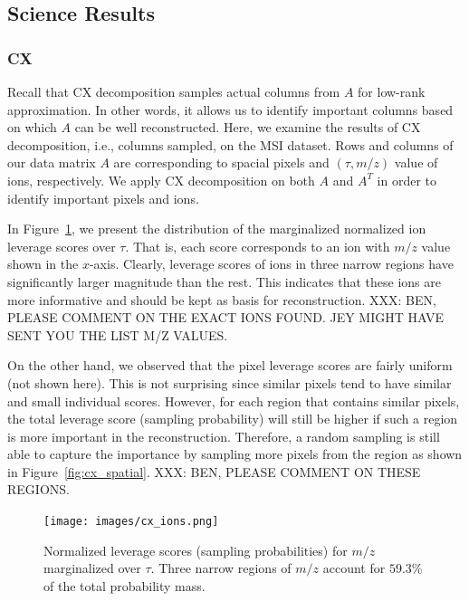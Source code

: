   \subsection{Science Results}
  \subsubsection{CX}
  Recall that CX decomposition samples actual columns from $A$ for low-rank approximation. In other words, it allows us to identify important columns based on which $A$ can be well reconstructed. Here, we examine the results of CX decomposition, i.e., columns sampled, on the MSI dataset.
 Rows and columns of our data matrix $A$ are corresponding to spacial pixels and $(\tau, m/z)$ value of ions, respectively. We apply CX decomposition on both $A$ and $A^T$ in order to identify important pixels and ions.
   
  In Figure~\ref{fig:cx_ions}, we present the distribution of the marginalized normalized ion leverage scores over $\tau$. That is, each score corresponds to an ion with $m/z$ value shown in the $x$-axis. Clearly, leverage scores of ions in three narrow regions have significantly larger magnitude than the rest. This indicates that these ions are more informative and should be kept as basis for reconstruction.  {\color{red} XXX: BEN, PLEASE COMMENT ON THE EXACT IONS FOUND. JEY MIGHT HAVE SENT YOU THE LIST M/Z VALUES. }
  
  On the other hand, we observed that the pixel leverage scores are fairly uniform (not shown here). This is not surprising since similar pixels tend to have similar and small individual scores. However, for each region that contains similar pixels, the total leverage score (sampling probability) will still be higher if such a region is more important in the reconstruction. Therefore, a random sampling is still able to capture the importance by sampling more pixels from the region as shown in Figure~\ref{fig:cx_spatial}.
  {\color{red} XXX: BEN, PLEASE COMMENT ON THESE REGIONS. }
    
    \begin{figure} [h!btp]
    \begin{centering}
    \texttt{[image: images/cx\_ions.png]}
    \end{centering}
    \caption{Normalized leverage scores (sampling probabilities) for $m/z$ marginalized over $\tau$.
      Three narrow regions of $m/z$ account for $59.3\%$ of the total probability mass.}
    \label{fig:cx_ions}
    \end{figure} 
    
